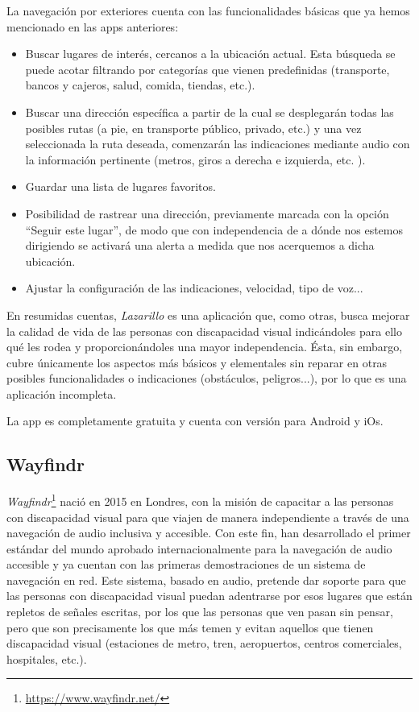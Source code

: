 La navegación por exteriores cuenta con las funcionalidades básicas que ya hemos mencionado en las apps anteriores: \begin{itemize}
	\item Buscar lugares de interés, cercanos a la ubicación actual. Esta búsqueda se puede acotar filtrando por categorías que vienen predefinidas (transporte, bancos y cajeros, salud, comida, tiendas, etc.).
	\item Buscar una dirección específica a partir de la cual se desplegarán todas las posibles rutas (a pie, en transporte público, privado, etc.) y una vez seleccionada la ruta deseada, comenzarán las indicaciones mediante audio con la información pertinente (metros, giros a derecha e izquierda, etc. ). 
	\item Guardar una lista de lugares favoritos.
	\item Posibilidad de rastrear una dirección, previamente marcada con la opción ``Seguir este lugar'', de modo que con independencia de a dónde nos estemos dirigiendo se activará una alerta a medida que nos acerquemos a dicha ubicación.
	\item Ajustar la configuración de las indicaciones, velocidad, tipo de voz...
\end{itemize}

En resumidas cuentas, \textit{Lazarillo} es una aplicación que, como otras, busca mejorar la calidad de vida de las personas con discapacidad visual indicándoles para ello qué les rodea y proporcionándoles una mayor independencia. Ésta, sin embargo, cubre únicamente los aspectos más básicos y elementales sin reparar en otras posibles funcionalidades o indicaciones (obstáculos, peligros...), por lo que es una aplicación incompleta.

La app es completamente gratuita y cuenta con versión para Android y iOs.


\subsection{Wayfindr} 
\textit{Wayfindr}\footnote{\url{https://www.wayfindr.net/}} nació en 2015 en Londres, con la misión de capacitar a las personas con discapacidad visual para que viajen de manera independiente a través de una navegación de audio inclusiva y accesible. Con este fin, han desarrollado el primer estándar del mundo aprobado internacionalmente para la navegación de audio accesible y ya cuentan con las primeras demostraciones de un sistema de navegación en red. Este sistema, basado en audio, pretende dar soporte para que las personas con discapacidad visual puedan adentrarse por esos lugares que están repletos de señales escritas, por los que las personas que ven pasan sin pensar, pero que son precisamente los que más temen y evitan aquellos que tienen discapacidad visual (estaciones de metro, tren, aeropuertos, centros comerciales, hospitales, etc.). 

